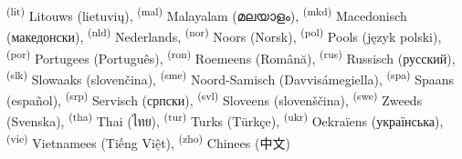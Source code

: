 \documentclass[onecolumn,a4paper,10pt]{report}
\begin{document}
\textsuperscript{(lit)}  Litouws (\foreignlanguage{lithuanian}{lietuvių}),
\textsuperscript{(mal)} Malayalam (\foreignlanguage{malayalam}{മലയാളം}),
\textsuperscript{(mkd)} Macedonisch (\foreignlanguage{macedonian}{македонски}),
\textsuperscript{(nld)}  Nederlands,
\textsuperscript{(nor)}  Noors (\foreignlanguage{norwegian}{Norsk}),
\textsuperscript{(pol)}  Pools (\foreignlanguage{polish}{język polski}),
\textsuperscript{(por)}  Portugees (\foreignlanguage{portuguese}{Português}),
\textsuperscript{(ron)}  Roemeens (\foreignlanguage{romanian}{Română}),
\textsuperscript{(rus)}  Russisch (\foreignlanguage{russian}{русский}),
\textsuperscript{(slk)}  Slowaaks (\foreignlanguage{slovak}{slovenčina}),
\textsuperscript{(sme)} Noord-Samisch (\foreignlanguage{samin}{Davvisámegiella}),
\textsuperscript{(spa)}  Spaans (\foreignlanguage{spanish}{español}),
\textsuperscript{(srp)}  Servisch (\foreignlanguage{serbian}{српски}),
\textsuperscript{(svl)}  Sloveens (\foreignlanguage{slovenian}{slovenščina}),
\textsuperscript{(swe)}  Zweeds (\foreignlanguage{swedish}{Svenska}),
\textsuperscript{(tha)}  Thai (\foreignlanguage{thai}{ไทย}),
\textsuperscript{(tur)}  Turks (\foreignlanguage{turkish}{Türkçe}),
\textsuperscript{(ukr)}  Oekraïens (\foreignlanguage{ukrainian}{українська}),
\textsuperscript{(vie)}  Vietnamees (\foreignlanguage{vietnamese}{Tiếng Việt}),
\textsuperscript{(zho)}  Chinees (\foreignlanguage{chinese}{中文})

\newpage

\end{document}
